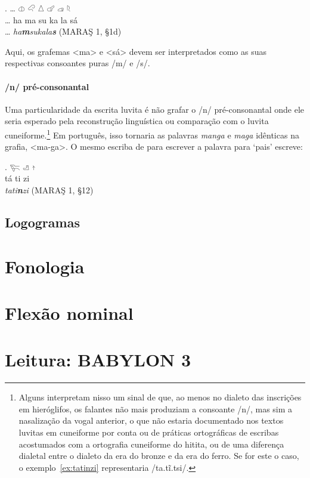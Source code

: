 \exg. \ldots{} \LARGE 𔓷 \LARGE 𔒅 \LARGE 𔖢 \LARGE 𔗧 \LARGE 𔓊 \LARGE 𔗦\\
\ldots{} ha ma su ka la sá\\
\ldots{} \emph{ha\textbf{m}sukala\textbf{s}} (MARAŞ 1, §1d)

Aqui, os grafemas <ma> e <sá> devem ser interpretados como as suas respectivas
consoantes puras /m/ e /s/.

\paragraph{/n/ pré-consonantal}
Uma particularidade da escrita luvita é não grafar o /n/
pré-consonantal onde ele seria esperado pela reconstrução linguística ou
comparação com o luvita cuneiforme.\footnote{%
	Alguns interpretam nisso um sinal de que, ao menos no dialeto das inscrições
	em hieróglifos, os falantes não mais produziam a consoante /n/, mas sim
	a nasalização da vogal anterior, o que não estaria documentado nos textos
	luvitas em cuneiforme por conta ou de práticas ortográficas de escribas
	acostumados com a ortografia cuneiforme do hitita, ou de uma diferença 
	dialetal entre o dialeto da era do bronze e da era do ferro. Se for este o
	caso, o exemplo~\ref{ex:tatinzi} representaria /ta.tĩ.tsi/.}
Em português, isso tornaria as palavras \emph{manga} e \emph{maga} idênticas na
grafia, <ma-ga>.
O mesmo escriba de \Last{} para escrever a palavra para `pais' escreve:

\exg.\label{ex:tatinzi} \LARGE 𔐞 \LARGE 𔑣 \LARGE 𔖩\\
tá ti zi\\
\emph{tati\textbf{n}zi}  (MARAŞ 1, §12)

\subsection{Logogramas}

\lipsum[4]

\section{Fonologia}

\lipsum[3]

\section{Flexão nominal}

\lipsum[1]

\section{Leitura: BABYLON 3}

